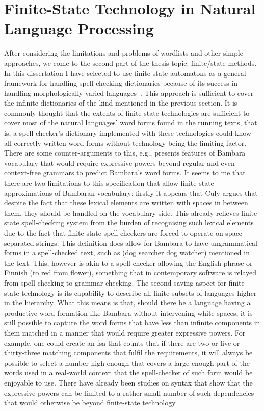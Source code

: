 \documentclass[officiallayout,final]{unihelcompling}
\newcommand\misspelt{\bgroup\markoverwith
{\textcolor{red}{\lower3.5pt\hbox{\sixly \char58}}}\ULon}
\begin{document}
\section{Finite-State Technology in Natural Language Processing}
\label{sec:finite-state-technology-in-nlp}

After considering the limitations and problems of wordlists and other simple
approaches, we come to the second part of the thesis topic: finite\-/state
methods. In this dissertation I have selected to use \glspl{finite-state
automaton} as a general framework for handling spell-checking dictionaries
because of its success in handling morphologically varied
languages~\citep[see]{beesley2003finite}. This approach is sufficient to cover
the infinite dictionaries of the kind mentioned in the previous section.  It is
commonly thought that the extents of finite-state technologies are sufficient
to cover most of the natural languages' word forms found in the running texts,
that is, a spell-checker's dictionary implemented with these technologies could
know all correctly written word-forms without technology being the limiting
factor. There are some counter-arguments to this, e.g.,
\citet{culy1987complexity} presents features of Bambara vocabulary that would
require expressive powers beyond regular and even context-free grammars to
predict Bambara's word forms. It seems to me that there are two limitations to
this specification that allow finite-state approximations of Bambaran
vocabulary: firstly it appears that Culy argues that despite the fact that
these lexical elements are written with spaces in between them, they should be
handled on the vocabulary side. This already relieves finite-state
spell-checking system from the burden of recognising such lexical elements due
to the fact that finite-state spell-checkers are forced to operate on
space-separated strings.  This definition does allow for Bambara to have
ungrammatical forms in a spell-checked text, such as \misspelt{\emph{wulunyina
o wulufilela}} (dog searcher dog watcher) mentioned in the text. This, however
is akin to a spell-checker allowing the English phrase \misspelt{\emph{I sees
he}} or Finnish \misspelt{\emph{punaiselle kukasta}} (to red from flower),
something that in contemporary software is relayed from spell-checking to
grammar checking. The second saving aspect for finite-state technology is its
capability to describe all finite subsets of languages higher in the hierarchy.
What this means is that, should there be a language having a productive
word-formation like Bambara without intervening white spaces, it is still
possible to capture the word forms that have less than infinite components in
them matched in a manner that would require greater expressive powers. For
example, one could create an \gls{fsa} that counts that if there are two or
five or thirty-three matching components that fulfil the requirements, it will
always be possible to select a number high enough that covers a large enough
part of the words used in a real-world context that the spell-checker of such
form would be enjoyable to use.  There have already been studies on syntax that
show that the expressive powers can be limited to a rather small number of such
dependencies that would otherwise be beyond finite-state
technology~\citep{karlsson2007constraints}.
\end{document}

